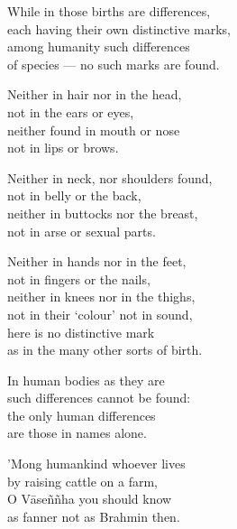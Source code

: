 \begin{MyDescription}{}
While in those births are differences,\\
each having their own distinctive marks,\\
among humanity such differences\\
of species — no such marks are found.
\end{MyDescription}

\begin{MyDescription}{}
Neither in hair nor in the head,\\
not in the ears or eyes,\\
neither found in mouth or nose\\
not in lips or brows.
\end{MyDescription}

\begin{MyDescription}{}
Neither in neck, nor shoulders found,\\
not in belly or the back,\\
neither in buttocks nor the breast,\\
not in arse or sexual parts.
\end{MyDescription}

\begin{MyDescription}{}
Neither in hands nor in the feet,\\
not in fingers or the nails,\\
neither in knees nor in the thighs,\\
not in their `colour' not in sound,\\
here is no distinctive mark\\
as in the many other sorts of birth.
\end{MyDescription}

\begin{MyDescription}{}
In human bodies as they are\\
such differences cannot be found:\\
the only human differences\\
are those in names alone.
\end{MyDescription}

\begin{MyDescription}{}
'Mong humankind whoever lives\\
by raising cattle on a farm,\\
O V\=ase\~n\~nha you should know\\
as fanner not as Brahmin then.
\end{MyDescription}

